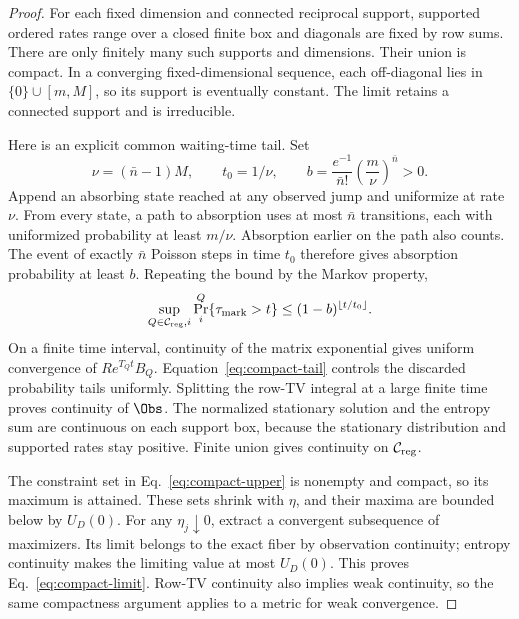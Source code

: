\begin{proof}
For each fixed dimension and connected reciprocal support, supported
ordered rates range over a closed finite box and diagonals are fixed by
row sums. There are only finitely many such supports and dimensions.
Their union is compact. In a converging fixed-dimensional sequence,
each off-diagonal lies in $\{0\}\cup[m,M]$, so its support is eventually
constant. The limit retains a connected support and is irreducible.

Here is an explicit common waiting-time tail. Set
\begin{equation}
 \nu=(\bar n-1)M,\qquad t_0=1/\nu,\qquad
 b=\frac{e^{-1}}{\bar n!}\left(\frac m\nu\right)^{\bar n}>0.
\end{equation}
Append an absorbing state reached at any observed jump and uniformize
at rate $\nu$. From every state, a path to absorption uses at most
$\bar n$ transitions, each with uniformized probability at least
$m/\nu$. Absorption earlier on the path also counts. The event of
exactly $\bar n$ Poisson steps in time $t_0$ therefore gives absorption
probability at least $b$. Repeating the bound by the Markov property,
\begin{equation}
 \sup_{Q\in\mathcal C_{\rm reg},i}
 \Pr_i^Q\{\tau_{\rm mark}>t\}
 \le(1-b)^{\lfloor t/t_0\rfloor}.
 \label{eq:compact-tail}
\end{equation}
On a finite time interval, continuity of the matrix exponential gives
uniform convergence of $Re^{T_Qt}B_Q$. Equation~\eqref{eq:compact-tail}
controls the discarded probability tails uniformly. Splitting the
row-TV integral at a large finite time proves continuity of $\Obs$.
The normalized stationary solution and the entropy sum are continuous
on each support box, because the stationary distribution and supported
rates stay positive. Finite union gives continuity on $\mathcal C_{\rm reg}$.

The constraint set in Eq.~\eqref{eq:compact-upper} is nonempty and
compact, so its maximum is attained. These sets shrink with $\eta$,
and their maxima are bounded below by $U_D(0)$. For any
$\eta_j\downarrow0$, extract a convergent subsequence of maximizers.
Its limit belongs to the exact fiber by observation continuity; entropy
continuity makes the limiting value at most $U_D(0)$. This proves
Eq.~\eqref{eq:compact-limit}. Row-TV continuity also implies weak
continuity, so the same compactness argument applies to a metric for
weak convergence.
\end{proof}

